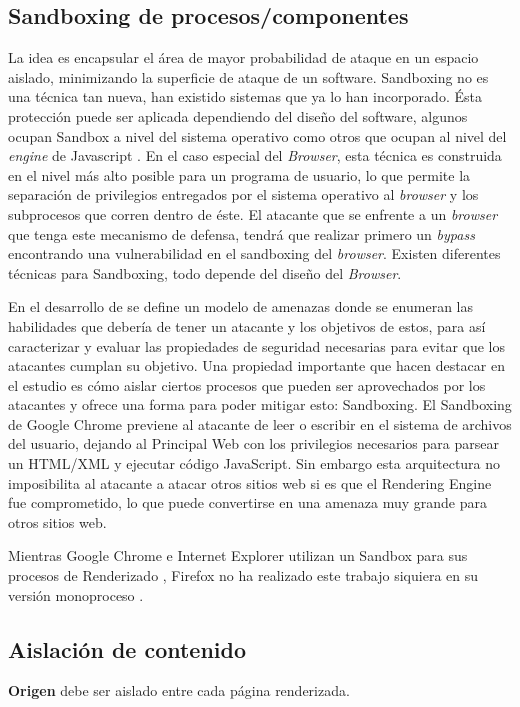 \subsection{Sandboxing de procesos/componentes}
    \label{chap3:Sandboxing}
    La idea es encapsular el área de mayor probabilidad de ataque en un espacio aislado, minimizando la superficie de ataque de un software. Sandboxing no es una técnica tan nueva, han existido sistemas que ya lo han incorporado. Ésta protección puede ser aplicada dependiendo del diseño del software, algunos ocupan Sandbox a nivel del sistema operativo como otros que ocupan al nivel del \textit{engine} de Javascript \cite{reis2009browser}. En el caso especial del \textit{Browser}, esta técnica es construida en el nivel más alto posible para un programa de usuario, lo que permite la separación de privilegios entregados por el sistema operativo al \textit{browser} y los subprocesos que corren dentro de éste. El atacante que se enfrente a un \textit{browser} que tenga este mecanismo de defensa, tendrá que realizar primero un \textit{bypass} encontrando una vulnerabilidad en el sandboxing del \textit{browser}. Existen diferentes técnicas para Sandboxing, todo depende del diseño del \textit{Browser}.

    En el desarrollo de \cite{barth2008security} se define un modelo de amenazas donde se enumeran las habilidades que debería de tener un atacante y los objetivos de estos, para así caracterizar y evaluar las propiedades de seguridad necesarias para evitar que los atacantes cumplan su objetivo. Una propiedad importante que hacen destacar en el estudio es cómo aislar ciertos procesos que pueden ser aprovechados por los atacantes y ofrece una forma para poder mitigar esto: Sandboxing. El Sandboxing de Google Chrome previene al atacante de leer o escribir en el sistema de archivos del usuario, dejando al Principal Web con los privilegios necesarios para parsear un HTML/XML y ejecutar código JavaScript. Sin embargo esta arquitectura no imposibilita al atacante a atacar otros sitios web si es que el Rendering Engine fue comprometido, lo que puede convertirse en una amenaza muy grande para otros sitios web.

    Mientras Google Chrome e Internet Explorer utilizan un Sandbox para sus procesos de Renderizado \cite{sandboxGC, }, Firefox no ha realizado este trabajo siquiera en su versión monoproceso \cite{NeckoElectro}.

 \subsection{Aislación de contenido}
 	\textbf{Origen} debe ser aislado entre cada página renderizada.

